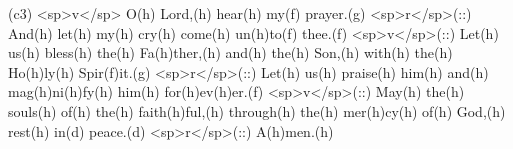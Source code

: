 (c3) <sp>v</sp> O(h) Lord,(h) hear(h) my(f) prayer.(g) <sp>r</sp>(::) And(h) let(h) my(h) cry(h) come(h) un(h)to(f) thee.(f) <sp>v</sp>(::) Let(h) us(h) bless(h) the(h) Fa(h)ther,(h) and(h) the(h) Son,(h) with(h) the(h) Ho(h)ly(h) Spir(f)it.(g) <sp>r</sp>(::) Let(h) us(h) praise(h) him(h) and(h) mag(h)ni(h)fy(h) him(h) for(h)ev(h)er.(f) <sp>v</sp>(::) May(h) the(h) souls(h) of(h) the(h) faith(h)ful,(h) through(h) the(h) mer(h)cy(h) of(h) God,(h) rest(h) in(d) peace.(d) <sp>r</sp>(::) A(h)men.(h)